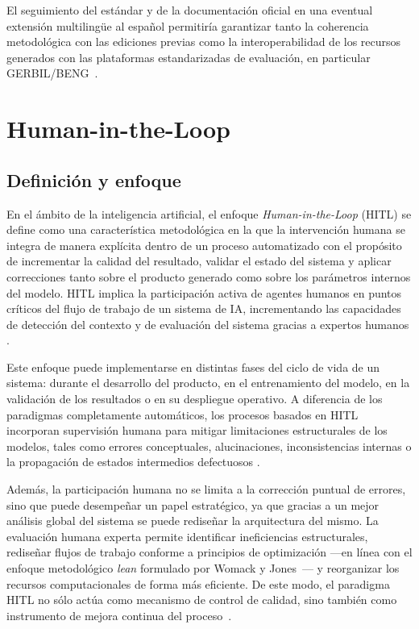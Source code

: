El seguimiento del estándar y de la documentación oficial en una eventual
extensión multilingüe al español permitiría garantizar tanto la coherencia
metodológica con las ediciones previas como la interoperabilidad de los
recursos generados con las plataformas estandarizadas de evaluación, en
particular GERBIL/BENG~\cite{GERBIL,Usbeck2015}.

\section{Human-in-the-Loop}

\subsection{Definición y enfoque}

En el ámbito de la inteligencia artificial, el enfoque
\textit{Human-in-the-Loop} (HITL) se define como una característica
metodológica en la que la intervención humana se integra de manera explícita
dentro de un proceso automatizado con el propósito de incrementar la calidad
del resultado, validar el estado del sistema y aplicar correcciones tanto sobre
el producto generado como sobre los parámetros internos del modelo. HITL
implica la participación activa de agentes humanos en puntos críticos del flujo
de trabajo de un sistema de IA, incrementando las capacidades de detección del
contexto y de evaluación del sistema gracias a expertos humanos
\cite{IBM_HITL_Definition, Cloud_HITL_Definition}.

Este enfoque puede implementarse en distintas fases del ciclo de vida de un
sistema: durante el desarrollo del producto, en el entrenamiento del modelo, en
la validación de los resultados o en su despliegue operativo. A diferencia de
los paradigmas completamente automáticos, los procesos basados en HITL
incorporan supervisión humana para mitigar limitaciones estructurales de los
modelos, tales como errores conceptuales, alucinaciones, inconsistencias
internas o la propagación de estados intermedios defectuosos
\cite{Wu2021_HITL_Survey}.

Además, la participación humana no se limita a la corrección puntual de
errores, sino que puede desempeñar un papel estratégico, ya que gracias a un
mejor análisis global del sistema se puede rediseñar la arquitectura del mismo.
La evaluación humana experta permite identificar ineficiencias estructurales,
rediseñar flujos de trabajo conforme a principios de optimización ---en línea con
el enfoque metodológico \textit{lean} formulado por Womack y
Jones~\cite{WomackJones1996_LeanThinking}--- y reorganizar los recursos
computacionales de forma más eficiente. De este modo, el paradigma HITL no sólo
actúa como mecanismo de control de calidad, sino también como instrumento de
mejora continua del proceso~\cite{MosqueiraRey2023_HITL}.

